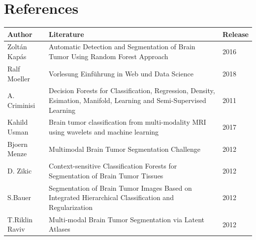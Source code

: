 \documentclass[
12pt,
headsepline,
bibliography=totoc,
twoside=semi,
fleqn
]{scrartcl}
\begin{document}
\section{References\label{sec.sec5}}




\begin{table}[H]
 \footnotesize
 \vspace{1ex}
 \centering 
 \begin{tabular}{p{2.5cm}p{8.7cm}p{2.8cm}}
 \toprule
 \textbf{Author} & \textbf{Literature} & \textbf{Release} \\
 \midrule
 Zoltán Kapás & Automatic Detection and Segmentation of Brain Tumor Using Random Forest Approach & 2016 \\
 Ralf Moeller & Vorlesung Einführung in Web und Data Science & 2018 \\
 A. Criminisi & Decision Forests for Classification, Regression, Density, Esimation, Manifold, Learning and Semi-Supervised Learning & 2011 \\
 Kahild Usman & Brain tumor classification from multi-modality MRI using wavelets and machine learning & 2017 \\
 Bjoern Menze&Multimodal Brain Tumor Segmentation Challenge&2012\\
 D. Zikic&Context-sensitive Classification Forests for Segmentation of Brain Tumor Tissues&2012\\
 S.Bauer&Segmentation of Brain Tumor Images Based on Integrated Hierarchical Classification and Regularization&2012\\
 T.Riklin Raviv&Multi-modal Brain Tumor Segmentation via Latent Atlases&2012


 \end{tabular}
 \vspace{2ex}
\end{table}


%
%
\end{document}
